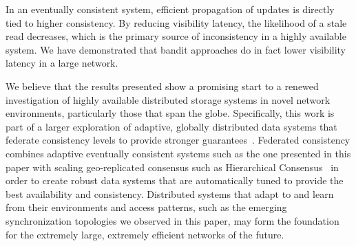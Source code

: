 In an eventually consistent system, efficient propagation of updates is
directly tied to higher consistency.
By reducing visibility latency, the likelihood of a stale read decreases,
which is the primary source of inconsistency in a highly available system.
We have demonstrated that bandit approaches do in fact lower visibility
latency in a large network.

We believe that the results presented show a promising start to a renewed
investigation of highly available distributed storage systems in novel
network environments, particularly those that span the globe.
Specifically, this work is part of a larger exploration of adaptive,
globally distributed data systems that federate consistency levels to provide
stronger guarantees~\cite{federated_consistency_poster}.
Federated consistency combines adaptive eventually consistent systems such as
the one presented in this paper with scaling geo-replicated consensus such as
Hierarchical Consensus~\cite{hc_brief_announcement} in order to create robust
data systems that are automatically tuned to provide the best availability
and consistency.
Distributed systems that adapt to and learn from their environments and
access patterns, such as the emerging synchronization topologies we observed
in this paper, may form the foundation for the extremely large, extremely
efficient networks of the future.
